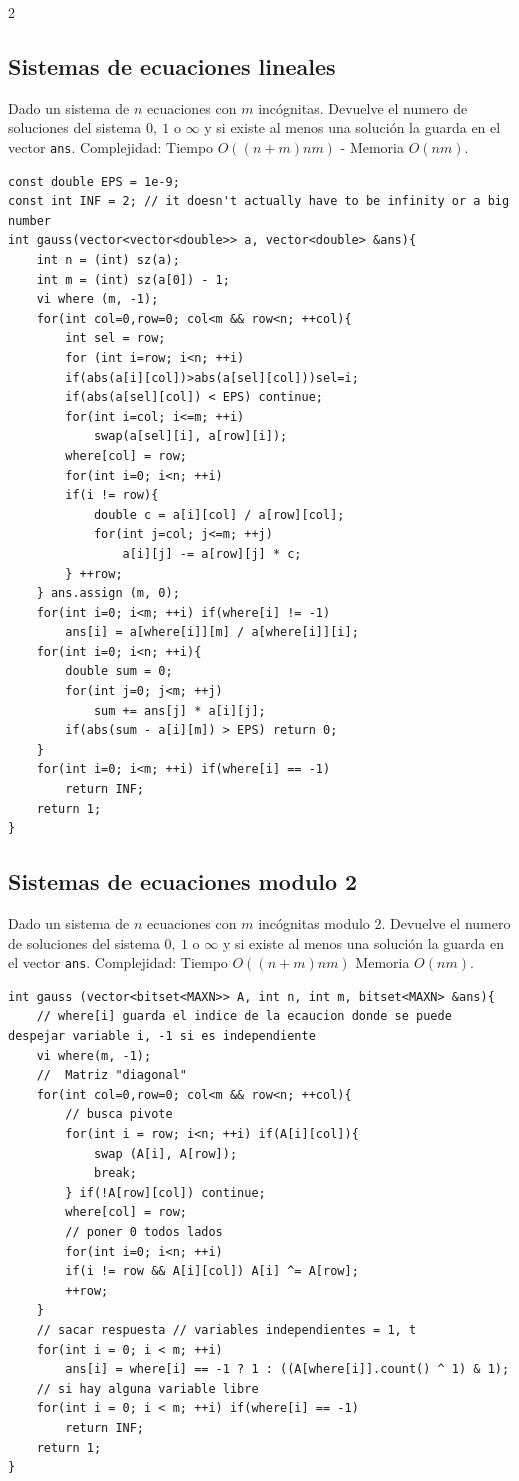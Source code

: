 \documentclass[10pt,spanish,mexico]{article}
\numberwithin{equation}{section}
\begin{document}
\begin{multicols}{2}
\subsection{Sistemas de ecuaciones lineales }
Dado un sistema de $n$ ecuaciones  con $m$ incógnitas. Devuelve el numero de soluciones del sistema $0, \ 1 $ o $\infty$ y si existe al menos una solución la guarda en el vector \texttt{ans}. Complejidad: Tiempo $O(  (n+m)nm ) $ - Memoria $O(nm)$.
\begin{verbatim}
const double EPS = 1e-9;
const int INF = 2; // it doesn't actually have to be infinity or a big number
int gauss(vector<vector<double>> a, vector<double> &ans){
    int n = (int) sz(a);
    int m = (int) sz(a[0]) - 1;
    vi where (m, -1);
    for(int col=0,row=0; col<m && row<n; ++col){
        int sel = row;
        for (int i=row; i<n; ++i)
        if(abs(a[i][col])>abs(a[sel][col]))sel=i;
        if(abs(a[sel][col]) < EPS) continue;
        for(int i=col; i<=m; ++i)
            swap(a[sel][i], a[row][i]);
        where[col] = row;
        for(int i=0; i<n; ++i)
        if(i != row){
            double c = a[i][col] / a[row][col];
            for(int j=col; j<=m; ++j)
                a[i][j] -= a[row][j] * c;
        } ++row;
    } ans.assign (m, 0);
    for(int i=0; i<m; ++i) if(where[i] != -1)
        ans[i] = a[where[i]][m] / a[where[i]][i];
    for(int i=0; i<n; ++i){
        double sum = 0;
        for(int j=0; j<m; ++j)
            sum += ans[j] * a[i][j];
        if(abs(sum - a[i][m]) > EPS) return 0;
    }
    for(int i=0; i<m; ++i) if(where[i] == -1)
        return INF;
    return 1;
}
\end{verbatim}

\vspace{-1.2\baselineskip}
\hrulefill
\subsection{Sistemas de ecuaciones modulo 2}
Dado un sistema de $n$ ecuaciones  con $m$ incógnitas modulo 2. Devuelve el numero de soluciones del sistema $0, \ 1 $ o $\infty$ y si existe al menos una solución la guarda en el vector \texttt{ans}. Complejidad: Tiempo $O(  (n+m)nm ) $  Memoria $O(nm)$.
\begin{verbatim}
int gauss (vector<bitset<MAXN>> A, int n, int m, bitset<MAXN> &ans){
    // where[i] guarda el indice de la ecaucion donde se puede despejar variable i, -1 si es independiente
    vi where(m, -1);
    //  Matriz "diagonal"
    for(int col=0,row=0; col<m && row<n; ++col){
        // busca pivote
        for(int i = row; i<n; ++i) if(A[i][col]){
            swap (A[i], A[row]);
            break;
        } if(!A[row][col]) continue;
        where[col] = row;
        // poner 0 todos lados
        for(int i=0; i<n; ++i)
        if(i != row && A[i][col]) A[i] ^= A[row];
        ++row;
    }
    // sacar respuesta // variables independientes = 1, t
    for(int i = 0; i < m; ++i)
        ans[i] = where[i] == -1 ? 1 : ((A[where[i]].count() ^ 1) & 1);
    // si hay alguna variable libre
    for(int i = 0; i < m; ++i) if(where[i] == -1)
        return INF;
    return 1;
}
\end{verbatim}


\end{multicols}
\end{document}
